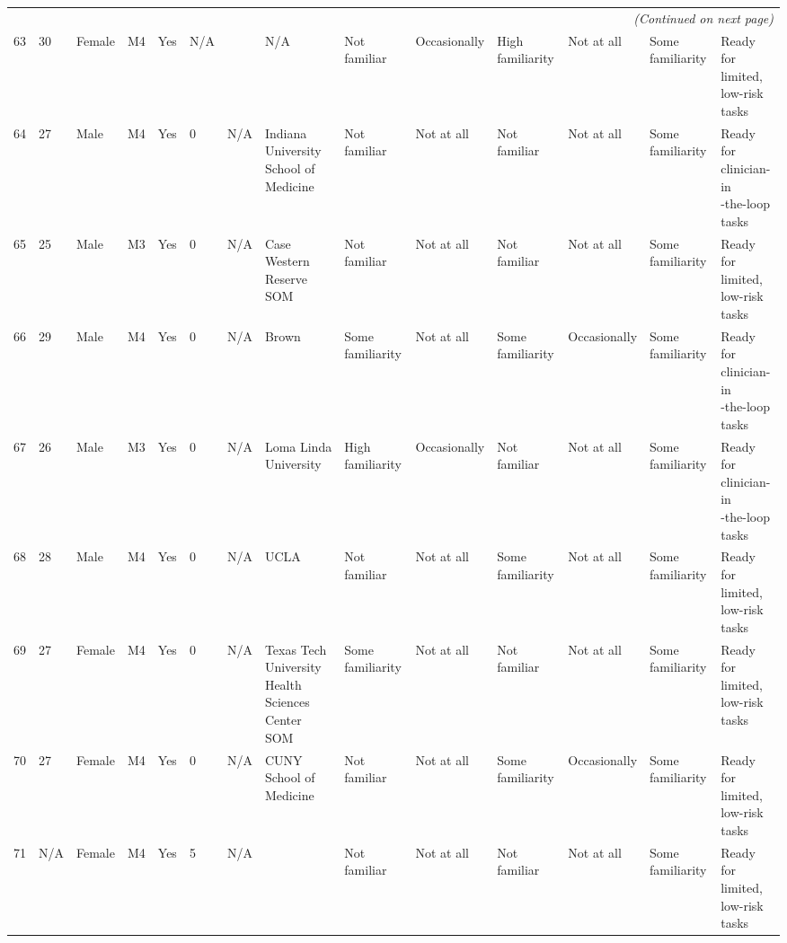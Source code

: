 \documentclass[11pt]{article}
\begin{document}
\begin{landscape}
{\begin{longtable}{rlllllllllllll}
\midrule
\multicolumn{14}{r}{\textit{(Continued on next page)}}\\
\endfoot

\bottomrule
\endlastfoot

63 & 30 & Female & M4 & Yes & N/A &  & N/A & Not familiar & Occasionally & High familiarity & Not at all & Some familiarity & \makecell[l]{Ready for limited, \\low-risk tasks} \\
64 & 27 & Male & M4 & Yes & 0 & N/A & Indiana University School of Medicine & Not familiar & Not at all & Not familiar & Not at all & Some familiarity & \makecell[l]{Ready for clinician-in\\-the-loop tasks} \\
65 & 25 & Male & M3 & Yes & 0 & N/A & Case Western Reserve SOM & Not familiar & Not at all & Not familiar & Not at all & Some familiarity & \makecell[l]{Ready for limited, \\low-risk tasks} \\
66 & 29 & Male & M4 & Yes & 0 & N/A & Brown & Some familiarity & Not at all & Some familiarity & Occasionally & Some familiarity & \makecell[l]{Ready for clinician-in\\-the-loop tasks} \\
67 & 26 & Male & M3 & Yes & 0 & N/A & Loma Linda University & High familiarity & Occasionally & Not familiar & Not at all & Some familiarity & \makecell[l]{Ready for clinician-in\\-the-loop tasks} \\
68 & 28 & Male & M4 & Yes & 0 & N/A & UCLA & Not familiar & Not at all & Some familiarity & Not at all & Some familiarity & \makecell[l]{Ready for limited, \\low-risk tasks} \\
69 & 27 & Female & M4 & Yes & 0 & N/A & Texas Tech University Health Sciences Center SOM & Some familiarity & Not at all & Not familiar & Not at all & Some familiarity & \makecell[l]{Ready for limited, \\low-risk tasks} \\
70 & 27 & Female & M4 & Yes & 0 & N/A & CUNY School of Medicine & Not familiar & Not at all & Some familiarity & Occasionally & Some familiarity & \makecell[l]{Ready for limited, \\low-risk tasks} \\
71 & N/A & Female & M4 & Yes & 5 & N/A &  & Not familiar & Not at all & Not familiar & Not at all & Some familiarity & \makecell[l]{Ready for limited, \\low-risk tasks} \\

\end{longtable}}
\end{landscape}
\end{document}
